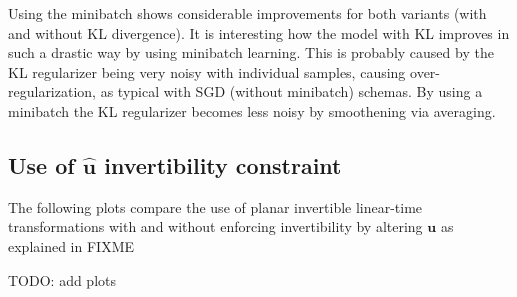 Using the minibatch shows considerable improvements for both variants (with and without KL
divergence).  It is interesting how the model with KL improves in such a drastic way
by using minibatch learning. This is probably caused by the KL regularizer being
very noisy with individual samples, causing over-regularization, as typical with SGD
(without minibatch) schemas. By using a minibatch
the KL regularizer becomes less noisy by smoothening via averaging. 

\subsection{Use of $\hat{\mathbf{u}}$ invertibility constraint}

The following plots compare the use of planar invertible linear-time transformations
with and without enforcing invertibility by altering $\mathbf{u}$ as
explained in FIXME

TODO: add plots
